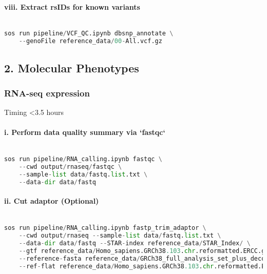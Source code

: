 \documentclass[12pt]{article}
\begin{document}
\paragraph*{viii. Extract rsIDs for known variants}


\noindent
\begin{lstlisting}[language=Python]

sos run pipeline/VCF_QC.ipynb dbsnp_annotate \
    --genoFile reference_data/00-All.vcf.gz

\end{lstlisting}




\subsection*{2. Molecular Phenotypes}


\subsubsection*{RNA-seq expression}
Timing <3.5 hours

\paragraph*{i. Perform data quality summary via `fastqc`}


\noindent
\begin{lstlisting}[language=Python]

sos run pipeline/RNA_calling.ipynb fastqc \
    --cwd output/rnaseq/fastqc \
    --sample-list data/fastq.list.txt \
    --data-dir data/fastq

\end{lstlisting}




\paragraph*{ii. Cut adaptor (Optional)}


\noindent
\begin{lstlisting}[language=Python]

sos run pipeline/RNA_calling.ipynb fastp_trim_adaptor \
    --cwd output/rnaseq --sample-list data/fastq.list.txt \
    --data-dir data/fastq --STAR-index reference_data/STAR_Index/ \
    --gtf reference_data/Homo_sapiens.GRCh38.103.chr.reformatted.ERCC.gtf \
    --reference-fasta reference_data/GRCh38_full_analysis_set_plus_decoy_hla.noALT_noHLA_noDecoy_ERCC.fasta \
    --ref-flat reference_data/Homo_sapiens.GRCh38.103.chr.reformatted.ERCC.ref.flat

\end{lstlisting}
\end{document}
